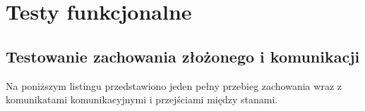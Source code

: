 \section{Testy funkcjonalne}

\subsection{Testowanie zachowania złożonego i komunikacji}

Na poniższym listingu przedstawiono jeden pełny przebieg zachowania wraz z komunikatami komunikacyjnymi i przejściami między stanami.


